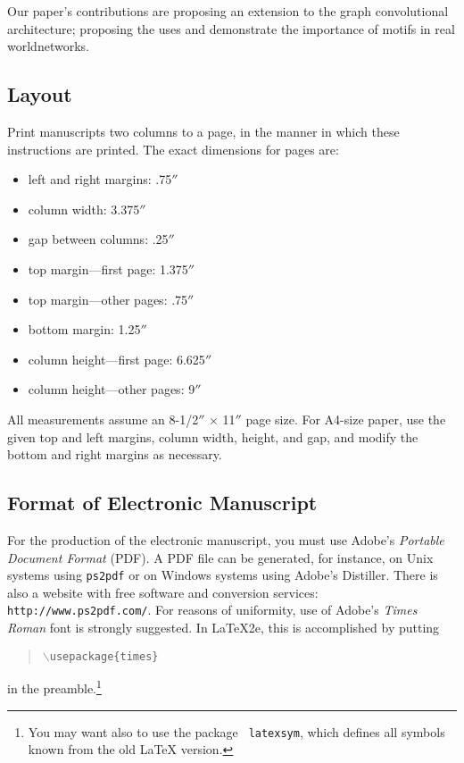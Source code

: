 \documentclass{article}
\theoremstyle{definition}
\begin{document}
Our paper's contributions are proposing an extension to the graph convolutional 
architecture; proposing the uses and demonstrate the importance of motifs in
real worldnetworks.

\subsection{Layout}

Print manuscripts two columns to a page, in the manner in which these
instructions are printed. The exact dimensions for pages are:
\begin{itemize}
\item left and right margins: .75$''$
\item column width: 3.375$''$
\item gap between columns: .25$''$
\item top margin---first page: 1.375$''$
\item top margin---other pages: .75$''$
\item bottom margin: 1.25$''$
\item column height---first page: 6.625$''$
\item column height---other pages: 9$''$
\end{itemize}

All measurements assume an 8-1/2$''$ $\times$ 11$''$ page size. For
A4-size paper, use the given top and left margins, column width,
height, and gap, and modify the bottom and right margins as necessary.

\subsection{Format of Electronic Manuscript}

For the production of the electronic manuscript, you must use Adobe's
{\em Portable Document Format} (PDF). A PDF file can be generated, for
instance, on Unix systems using {\tt ps2pdf} or on Windows systems
using Adobe's Distiller. There is also a website with free software
and conversion services: {\tt http://www.ps2pdf.com/}. For reasons of
uniformity, use of Adobe's {\em Times Roman} font is strongly suggested. In
\LaTeX2e{}, this is accomplished by putting
\begin{quote} 
\mbox{\tt $\backslash$usepackage\{times\}}
\end{quote}
in the preamble.\footnote{You may want also to use the package {\tt
latexsym}, which defines all symbols known from the old \LaTeX{}
version.}
  
\end{document}
